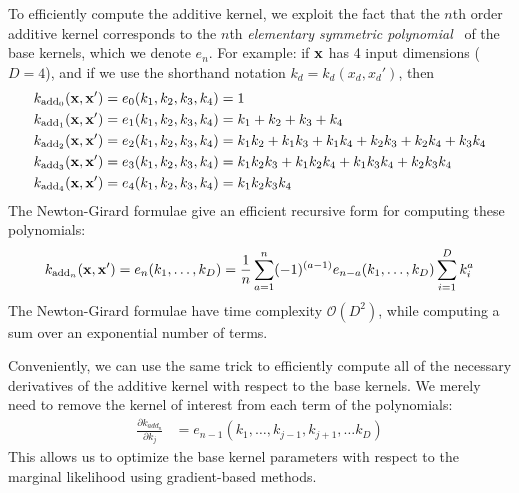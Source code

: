 To efficiently compute the additive kernel, we exploit the fact that the $n$th order additive kernel corresponds to the $n$th \textit{elementary symmetric polynomial}~\citep{macdonald1998symmetric}
of the base kernels, which we denote $e_n$.
For example:  if ${\bf{x}}$ has 4 input dimensions ($D = 4$), and if we use the shorthand notation $k_d = k_d(x_d, x_d')$, then
%
\begin{align}
k_{\textnormal{add}_0}({\bf x, x'}) & = e_0( k_1, k_2, k_3, k_4 ) = 1 \\
k_{\textnormal{add}_1}({\bf x, x'}) & = e_1( k_1, k_2, k_3, k_4 ) = k_1 + k_2 + k_3 + k_4 \\
k_{\textnormal{add}_2}({\bf x, x'}) & = e_2( k_1, k_2, k_3, k_4 ) = k_1 k_2 + k_1 k_3 + k_1k_4 + k_2 k_3 + k_2 k_4 + k_3 k_4 \\
k_{\textnormal{add}_3}({\bf x, x'}) & = e_3( k_1, k_2, k_3, k_4 ) = k_1 k_2 k_3 + k_1 k_2 k_4 + k_1 k_3 k_4 + k_2 k_3 k_4 \\
k_{\textnormal{add}_4}({\bf x, x'}) & = e_4( k_1, k_2, k_3, k_4 ) = k_1 k_2 k_3 k_4
\end{align}
%
The Newton-Girard formulae give an efficient recursive form for computing these polynomials:
%
\begin{align}
k_{\textnormal{add}_n}({\bf x, x'}) = e_n(k_1,\dots,k_D) = \frac{1}{n} \sum_{a=1}^n (-1)^{(a-1)} e_{n-a}(k_1,\dots,k_D)  \sum_{i=1}^Dk_i^a
\end{align}
%
The Newton-Girard formulae have time complexity $\mathcal{O}( D^2 )$, while computing a sum over an exponential number of terms.

Conveniently, we can use the same trick to efficiently compute all of the necessary derivatives of the additive kernel with respect to the base kernels.
We merely need to remove the kernel of interest from each term of the polynomials:
%
\begin{align}
\frac{\partial k_{add_n}}{\partial k_j} & = e_{n-1}(k_1,\dots,k_{j-1},k_{j+1}, \dots k_D)
\end{align}
%
This allows us to optimize the base kernel parameters with respect to the marginal likelihood using gradient-based methods.

